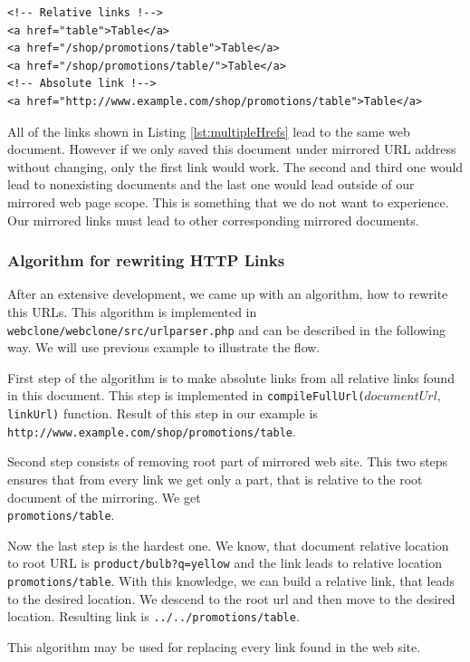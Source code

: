 \begin{lstlisting}[caption={Multiple types of HTTP links},label={lst:multipleHrefs}]
<!-- Relative links !-->
<a href="table">Table</a>
<a href="/shop/promotions/table">Table</a>
<a href="/shop/promotions/table/">Table</a>
<!-- Absolute link !-->
<a href="http://www.example.com/shop/promotions/table">Table</a>
\end{lstlisting}

All of the links shown in Listing \ref{lst:multipleHrefs} lead to the same web document. However if we only saved this document under mirrored URL address without changing, only the first link would work. The second and third one would lead to nonexisting documents and the last one would lead outside of our mirrored web page scope. This is something that we do not want to experience. Our mirrored links must lead to other corresponding mirrored documents.

\subsubsection{Algorithm for rewriting HTTP Links}
After an extensive development, we came up with an algorithm, how to rewrite this URLs. This algorithm is implemented in \texttt{webclone/webclone/src/urlparser.php} and can be described in the following way. We will use previous example to illustrate the flow.

First step of the algorithm is to make absolute links from all relative links found in this document. This step is implemented in \texttt{compileFullUrl($documentUrl, $linkUrl)} function. Result of this step in our example is \\ \texttt{http://www.example.com/shop/promotions/table}.

Second step consists of removing root part of mirrored web site. This two steps ensures that from every link we get only a part, that is relative to the root document of the mirroring. We get \\ \texttt{promotions/table}.

Now the last step is the hardest one. We know, that document relative location to root URL is \texttt{product/bulb?q=yellow} and the link leads to relative location \texttt{promotions/table}. With this knowledge, we can build a relative link, that leads to the desired location. We descend to the root url and then move to the desired location. Resulting link is \texttt{../../promotions/table}. 

This algorithm may be used for replacing every link found in the web site.

